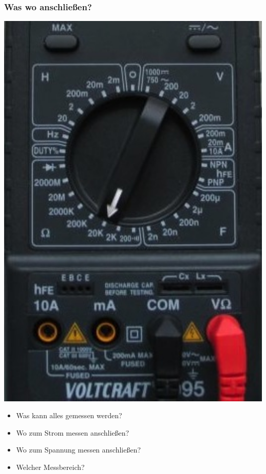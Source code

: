 \begin{frame}
    \frametitle{Was wo anschließen?}
	\begin{minipage}{0.4\textwidth}
        \includegraphics[width=1\textwidth]{e02/digitalmultimeterMess.jpg}
	\end{minipage}
	\begin{minipage}{0.4\textwidth}	
	\begin{itemize}
		\item Was kann alles gemessen werden?
		\item Wo zum Strom messen anschließen?
		\item Wo zum Spannung messen anschließen?
		\item Welcher Messbereich?
	\end{itemize}
	\end{minipage}
\end{frame}

